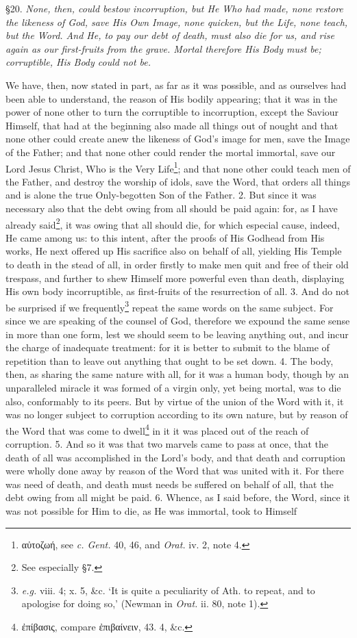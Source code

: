 §20. \emph{None, then, could bestow incorruption, but He Who had made, none restore the likeness of God, save His Own Image, none quicken, but the Life, none teach, but the Word. And He, to pay our debt of death, must also die for us, and rise again as our first-fruits from the grave. Mortal therefore His Body must be; corruptible, His Body could not be.}

We have, then, now stated in part, as far as it was possible, and as ourselves had been able to understand, the reason of His bodily appearing; that it was in the power of none other to turn the corruptible to incorruption, except the Saviour Himself, that had at the beginning also made all things out of nought and that none other could create anew the likeness of God’s image for men, save the Image of the Father; and that none other could render the mortal immortal, save our Lord Jesus Christ, Who is the Very Life\footnote{\textgreek{αὐτοζωή}, see \emph{c. Gent.} 40, 46, and \emph{Orat.} iv. 2, note 4.}; and that none other could teach men of the Father, and destroy the worship of idols, save the Word, that orders all things and is alone the true Only-begotten Son of the Father. 2. But since it was necessary also that the debt owing from all should be paid again: for, as I have already said\footnote{See especially §7.}, it was owing that all should die, for which especial cause, indeed, He came among us: to this intent, after the proofs of His Godhead from His works, He next offered up His sacrifice also on behalf of all, yielding His Temple to death in the stead of all, in order firstly to make men quit and free of their old trespass, and further to shew Himself more powerful even than death, displaying His own body incorruptible, as first-fruits of the resurrection of all. 3. And do not be surprised if we frequently\footnote{\emph{e.g.} viii. 4; x. 5, \&c. ‘It is quite a peculiarity of Ath. to repeat, and to apologise for doing so,’ (Newman in \emph{Orat.} ii. 80, note 1).} repeat the same words on the same subject. For since we are speaking of the counsel of God, therefore we expound the same sense in more than one form, lest we should seem to be leaving anything out, and incur the charge of inadequate treatment: for it is better to submit to the blame of repetition than to leave out anything that ought to be set down. 4. The body, then, as sharing the same nature with all, for it was a human body, though by an unparalleled miracle it was formed of a virgin only, yet being mortal, was to die also, conformably to its peers. But by virtue of the union of the Word with it, it was no longer subject to corruption according to its own nature, but by reason of the Word that was come to dwell\footnote{\textgreek{ἐπίβασις}, compare \textgreek{ἐπιβαίνειν}, 43. 4, \&c.} in it it was placed out of the reach of corruption. 5. And so it was that two marvels came to pass at once, that the death of all was accomplished in the Lord’s body, and that death and corruption were wholly done away by reason of the Word that was united with it. For there was need of death, and death must needs be suffered on behalf of all, that the debt owing from all might be paid. 6. Whence, as I said before, the Word, since it was not possible for Him to die, as He was immortal, took to Himself 